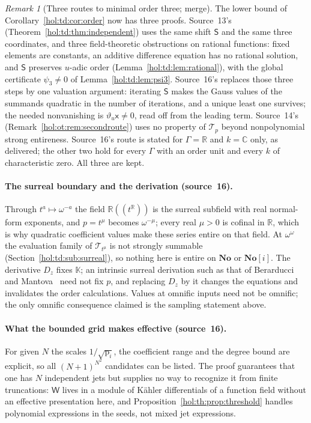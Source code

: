 \documentclass[11pt]{article}
\numberwithin{equation}{section}
\theoremstyle{definition}
\theoremstyle{remark}
\newtheorem{remark}[theorem]{Remark}
\newcommand{\C}{\mathbb C}
\newcommand{\R}{\mathbb R}
\newcommand{\No}{\mathbf{No}}
\newcommand{\KK}{\mathbb K}
\begin{document}
\begin{remark}[Three routes to minimal order three; merge]
\label{hol:th:rem:thirdroute}
The lower bound of Corollary~\ref{hol:td:cor:order} now has three proofs.
Source~13's (Theorem~\ref{hol:td:thm:independent}) uses the same shift
$\mathsf S$ and the same three coordinates, and three field-theoretic
obstructions on rational functions: fixed elements are constants, an additive
difference equation has no rational solution, and $\mathsf S$ preserves
$u$-adic order (Lemma~\ref{hol:td:lem:rational}), with the global certificate
$\psi_3\ne0$ of Lemma~\ref{hol:td:lem:psi3}. Source~16's replaces those three
steps by one valuation argument: iterating $\mathsf S$ makes the Gauss values
of the summands quadratic in the number of iterations, and a unique least one
survives; the needed nonvanishing is $\vartheta_u\mathsf x\ne0$, read off from
the leading term. Source~14's (Remark~\ref{hol:ot:rem:secondroute}) uses no
property of $\mathcal T_p$ beyond nonpolynomial strong entireness. Source~16's
route is stated for $\Gamma=\R$ and $k=\C$ only, as delivered; the other two
hold for every $\Gamma$ with an order unit and every $k$ of characteristic
zero. All three are kept.
\end{remark}

\paragraph{The surreal boundary and the derivation (source~16).}
Through $t^a\mapsto\omega^{-a}$ the field $\R((t^\R))$ is the surreal subfield
with real normal-form exponents, and $p=t^\mu$ becomes $\omega^{-\mu}$; every
real $\mu>0$ is cofinal in $\R$, which is why quadratic coefficient values
make these series entire on that field. At $\omega^\omega$ the evaluation
family of $\mathcal T_{t^\mu}$ is not strongly summable
(Section~\ref{hol:td:sub:surreal}), so nothing here is entire on $\No$ or
$\No[i]$. The derivative $D_z$ fixes $\KK$; an intrinsic surreal derivation
such as that of Berarducci and Mantova~\cite{bm} need not fix $p$, and
replacing $D_z$ by it changes the equations and invalidates the order
calculations. Values at omnific inputs need not be omnific; the only omnific
consequence claimed is the sampling statement above.

\paragraph{What the bounded grid makes effective (source~16).}
For given $N$ the scales $1/\sqrt{\mathrm p_i}$, the coefficient range and
the degree bound are explicit, so all $(N+1)^{N^2}$ candidates can be
listed. The proof guarantees that one has $N$ independent jets but supplies
no way to recognize it from finite truncations: $\mathsf W$ lives in a module of
K\"ahler differentials of a function field without an effective presentation
here, and Proposition~\ref{hol:th:prop:threshold} handles polynomial
expressions in the seeds, not mixed jet expressions.
\end{document}

